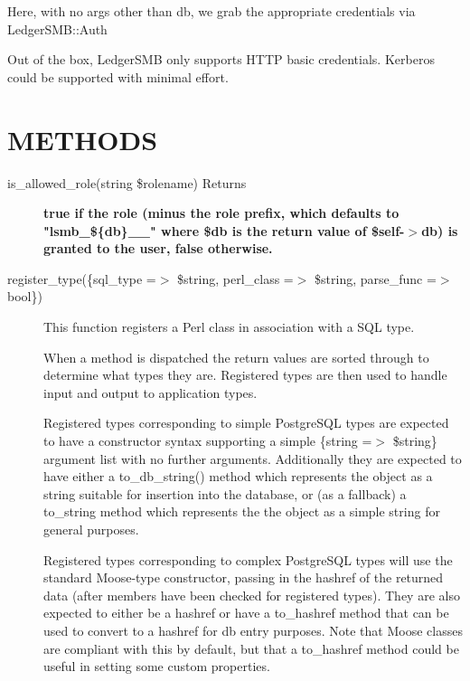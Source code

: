 \begin{description}
\begin{description}
\begin{description}
\begin{description}
\begin{description}
\begin{description}
\begin{description}
\begin{description}
Here, with no args other than db, we grab the appropriate credentials via 
LedgerSMB::Auth



Out of the box, LedgerSMB only supports HTTP basic credentials. Kerberos could
be supported with minimal effort.

\end{description}
\section{METHODS\label{METHODS}}
\begin{description}

\item[{is\_allowed\_role(string \$rolename) Returns}] \textbf{true if the role (minus the role prefix, which defaults to "lsmb\_\$\{db\}\_\_" where \$db is the return value of \$self-$>$db) is granted to the user, false otherwise.}
\item[{register\_type(\{sql\_type =$>$ \$string, perl\_class =$>$ \$string, parse\_func =$>$bool\})}] \mbox{}

This function registers a Perl class in association with a SQL type.



When a method is dispatched the return values are sorted through to determine
what types they are.  Registered types are then used to handle input and output
to application types.



Registered types corresponding to simple PostgreSQL types are expected to have a
constructor syntax supporting a simple \{string =$>$ \$string\} argument list with no
further arguments.  Additionally they are expected to have either a
to\_db\_string() method which represents the object as a string suitable for
insertion into the database, or (as a fallback) a to\_string method which
represents the the object as a simple string for general purposes.



Registered types corresponding to complex PostgreSQL types will use the standard
Moose-type constructor, passing in the hashref of the returned data (after
members have been checked for registered types).  They are also expected to
either be a hashref or have a to\_hashref method that can be used to convert to a
hashref for db entry purposes.  Note that Moose classes are compliant with this
by default, but that a to\_hashref method could be useful in setting some custom
properties.




\end{description}
\end{description}
\end{description}
\end{description}
\end{description}
\end{description}
\end{description}
\end{description}
